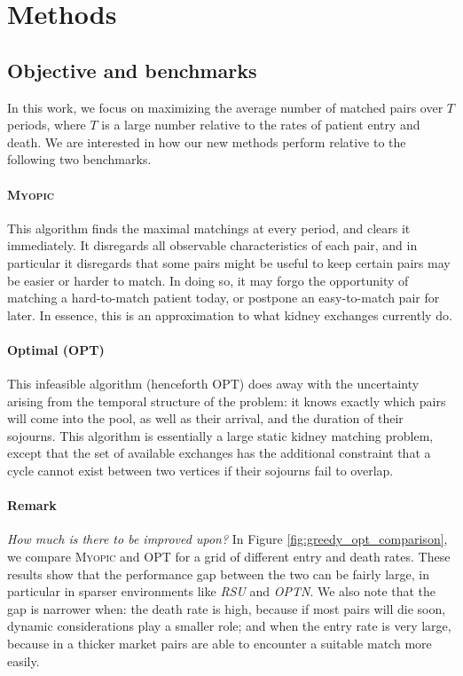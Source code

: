 \documentclass[format=acmsmall, review=false]{acmart}
\begin{document}
\section{Methods}

\subsection{Objective and benchmarks}

In this work, we focus on maximizing the average number of matched pairs over $T$ periods, where $T$ is a large number relative to the rates of patient entry and death. We are interested in how our new methods perform relative to the following two benchmarks.

\paragraph{\textsc{Myopic}}

This algorithm finds the maximal matchings at every period, and clears it immediately. It disregards all observable characteristics of each pair, and in particular it disregards that some pairs might be useful to keep certain pairs may be easier or harder to match. In doing so, it may forgo the opportunity of matching a hard-to-match patient today, or postpone an easy-to-match pair for later. In essence, this is an approximation to what kidney exchanges currently do.

\paragraph{Optimal (\textsc{OPT})} This infeasible algorithm (henceforth OPT) does away with the uncertainty arising from the temporal structure of the problem: it knows exactly which pairs will come into the pool, as well as their arrival, and the duration of their sojourns. This algorithm is essentially a large static kidney matching problem, except that the set of available exchanges has the additional constraint that a cycle cannot exist between two vertices if their sojourns fail to overlap.

\paragraph{\textbf{Remark}} \textit{How much is there to be improved upon?} In Figure \ref{fig:greedy_opt_comparison}, we compare \textsc{Myopic} and \textsc{OPT} for a grid of different entry and death rates. These results show that the performance gap between the two can be fairly large, in particular in sparser environments like \emph{RSU} and \emph{OPTN}. We also note that the gap is narrower when: the death rate is high, because if most pairs will die soon, dynamic considerations play a smaller role; and when the entry rate is very large, because in a thicker market pairs are able to encounter a suitable match more easily.
\end{document}
